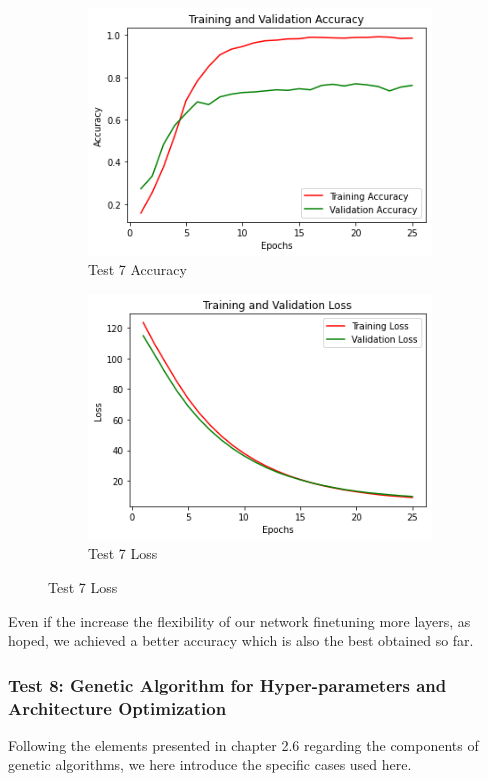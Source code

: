\begin{figure}[H]
	\begin{subfigure}{0.5\textwidth}
		\includegraphics[width=0.9\linewidth]{img/vgg16/vgg16ft2dropregacc.png} 
		\caption{Test 7 Accuracy}
		\label{fig:vgg16ft2dropregacc}
	\end{subfigure}
	\begin{subfigure}{0.5\textwidth}
		\includegraphics[width=0.9\linewidth]{img/vgg16/vgg16ft2dropregloss.png}
		\caption{Test 7 Loss}
		\label{fig:vgg16ft2dropregloss}
	\end{subfigure}
\end{figure}

Even if the increase the flexibility of our network finetuning more layers, as hoped, we achieved a better accuracy which is also the best obtained so far.




\subsubsection{Test 8: Genetic Algorithm for Hyper-parameters and Architecture Optimization}
Following the elements presented in chapter 2.6 regarding the components of genetic algorithms, we here introduce the specific cases used here.
